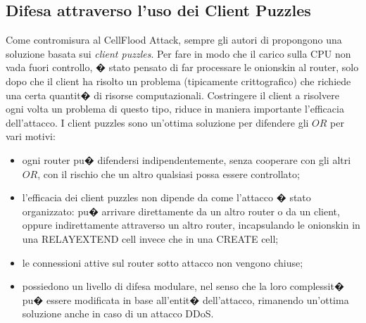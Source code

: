 \subsection{Difesa attraverso l'uso dei Client Puzzles}
Come contromisura al CellFlood Attack, sempre gli autori di \cite{cellflood} propongono una soluzione basata sui \emph{client puzzles}. Per fare in modo che il carico sulla CPU non vada fuori controllo, � stato pensato di far processare le onionskin al router, solo dopo che il client ha risolto un problema (tipicamente crittografico) che richiede una certa quantit� di risorse computazionali. Costringere il client a risolvere ogni volta un problema di questo tipo, riduce in maniera importante l'efficacia dell'attacco. I client puzzles sono un'ottima soluzione per difendere gli $OR$ per vari motivi:
\begin{itemize}
\item ogni router pu� difendersi indipendentemente, senza cooperare con gli altri $OR$, con il rischio che un altro qualsiasi possa essere controllato; 
\item l'efficacia dei client puzzles non dipende da come l'attacco � stato organizzato: pu� arrivare direttamente da un altro router o da un client, oppure indirettamente attraverso un altro router, incapsulando le onionskin in una {\ttfamily RELAY\textunderscore EXTEND} cell invece che in una {\ttfamily CREATE} cell;
\item le connessioni attive sul router sotto attacco non vengono chiuse;
\item possiedono un livello di difesa modulare, nel senso che la loro complessit� pu� essere modificata in base all'entit� dell'attacco, rimanendo un'ottima soluzione anche in caso di un attacco DDoS.
\end{itemize}


